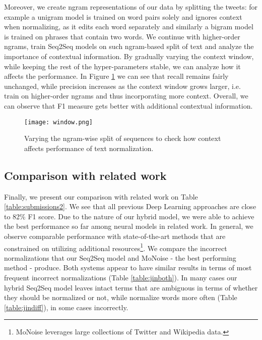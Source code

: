 \documentclass[letterpaper]{article} \usepackage{aaai19}  \usepackage{times}  \usepackage{helvet} \usepackage{courier}  \usepackage[hyphens]{url}  \usepackage{graphicx} \urlstyle{rm} \def\UrlFont{\rm}  \usepackage{graphicx}  \frenchspacing  \setlength{\pdfpagewidth}{8.5in}  \setlength{\pdfpageheight}{11in}
\newcommand{\citet}[1]{\citeauthor{#1}~\shortcite{#1}}
\newcommand{\citep}{\cite}
\newcommand{\hide}[1]{} \newcommand{\ag}[1]{\textsf{\textbf{\color{red}{[AG: #1]}}}}
\begin{document}
Moreover, we create ngram representations of our data by splitting the tweets: for example a unigram model is trained on word pairs solely and ignores context when normalizing, as it edits each word separately and similarly a bigram model is trained on phrases that contain two words. We continue with higher-order ngrams, train Seq2Seq models on such ngram-based split of text and analyze the importance of contextual information. By gradually varying the context window, while keeping the rest of the hyper-parameters stable, we can analyze how it affects the performance. In Figure \ref{fig:ngram} we can see that recall remains fairly unchanged, while precision increases as the context window grows larger, i.e. train on higher-order ngrams and thus incorporating more context. Overall, we can observe that F1 measure gets better with additional contextual information.  

\begin{figure}[h]
    \centering
    \texttt{[image: window.png]}
    \caption{Varying the ngram-wise split of sequences to check how context affects performance of text normalization.}
    \label{fig:ngram}
\end{figure}

\subsection{Comparison with related work}
Finally, we present our comparison with related work on Table \ref{table:submissions2}. We see that all previous Deep Learning approaches are close to 82\% F1 score. Due to the nature of our hybrid model, we were able to achieve the best performance so far among neural models in related work. In general, we observe comparable performance with state-of-the-art methods that are constrained on utilizing additional resources\footnote{MoNoise \citep{van2017monoise} leverages large collections of Twitter and Wikipedia data.}. We compare the incorrect normalizations that our Seq2Seq model and MoNoise - the best performing method - produce. Both systems appear to have similar results in terms of most frequent incorrect normalizations (Table \ref{table:jinboth}). In many cases our hybrid Seq2Seq model leaves intact terms that are ambiguous in terms of whether they should be normalized or not, while \citep{van2017monoise} normalize words more often (Table \ref{table:jindiff}), in some cases incorrectly.  

\hide{Additionally, we have implemented the forest approach\footnote{Our implementation achieved $83.04\%$ F1 score, slightly less than \citet{jin2015ncsu} due to insufficient information on how splitting phrases was resolved.} (\textbf{Our\_RF} in Table \ref{table:submissions2})  and compared the incorrect normalizations that our Seq2Seq model and the random forest produce. Both systems appear to have similar results in terms of most frequent incorrect normalizations (Table \ref{table:jin}).}
\end{document}
